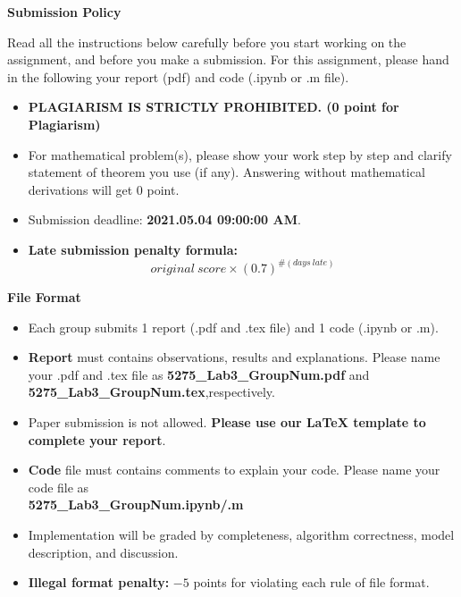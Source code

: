 \documentclass[a4 paper]{article}
\begin{document}
\noindent{\color{LightRubineRed} \rule{\linewidth}{1mm} }
\begin{center}
    \textbf{\Large{Submission Policy}}
\end{center}
\noindent{\color{LightRubineRed} \rule{\linewidth}{1mm} }
\par Read all the instructions below carefully before you start working on the assignment, and before you make a submission. For this assignment, please hand in the following your report (pdf) and code (.ipynb or .m file).
\begin{itemize}
    \item \textbf{PLAGIARISM IS STRICTLY PROHIBITED. (0 point for Plagiarism)}
    \item For mathematical problem(s), please show your work step by step and clarify statement of theorem you use (if any). Answering without mathematical derivations will get 0 point.
    \item Submission deadline: \textbf{2021.05.04 09:00:00 AM}. 
    \item \textbf{Late submission penalty formula:} $$original \ score\times(0.7)^{\#(days \ late)}$$ 
\end{itemize}
\noindent{\color{LightRubineRed} \rule{\linewidth}{0.1mm}}
\begin{center}
    \textbf{\large{File Format}}
\end{center}
\begin{itemize}
    \item Each group submits 1 report (.pdf and .tex file) and 1 code (.ipynb or .m).
    \item \textbf{Report} must contains observations, results and explanations. Please name your .pdf and .tex file as \textbf{5275\_Lab3\_GroupNum.pdf} and \textbf{5275\_Lab3\_GroupNum.tex},respectively.
    \item Paper submission is not allowed. \textbf{Please use our \LaTeX{} template to complete your report}.
    \item \textbf{Code} file must contains comments to explain your code. Please name your code file as\\ \textbf{5275\_Lab3\_GroupNum.ipynb/.m}
    \item Implementation will be graded by completeness, algorithm correctness, model description, and discussion.
    \item \textbf{Illegal format penalty:} $-5$ points for violating each rule of file format.
\end{itemize}
\end{document}
